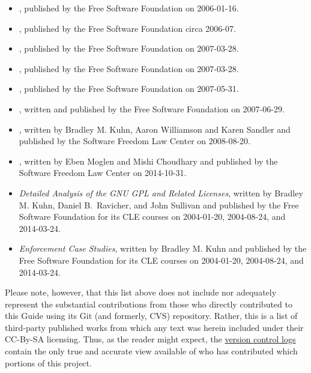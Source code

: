 \label{third-party-citation-list}
\begin{itemize}
\item {}, published by the Free
 Software Foundation on 2006-01-16.
\item {}, published by the Free
 Software Foundation circa 2006-07.
\item {}, published by the Free
 Software Foundation on 2007-03-28.
\item {}, published by the Free Software Foundation on 2007-03-28.
\item {}, published by the Free
 Software Foundation on 2007-05-31.
\item {}, written and published by the Free
 Software Foundation on 2007-06-29.
\item {}, written by Bradley M. Kuhn, Aaron
Williamson and Karen Sandler and published by the Software Freedom Law Center on 2008-08-20.
\item {}, written by Eben Moglen and Mishi Choudhary and published by the Software Freedom Law Center on 2014-10-31.
\item \textit{Detailed Analysis of the GNU GPL and Related Licenses}, written by
Bradley M. Kuhn, Daniel B.~Ravicher, and John Sullivan and published by the Free Software Foundation for its CLE courses on 2004-01-20,
2004-08-24, and 2014-03-24.
\item \textit{Enforcement Case Studies}, written by Bradley M. Kuhn and published by the Free
 Software Foundation for its CLE courses on 2004-01-20, 2004-08-24, and 2014-03-24.
\end{itemize}

Please note, however, that this list above does not include nor adequately
represent the substantial contributions from those who directly
contributed to this Guide using its Git (and formerly, CVS) repository.
Rather, this is a list of third-party published works from which any text was
herein included under their CC-By-SA licensing.  Thus, as the reader might
expect, the
\href{https://k.copyleft.org/guide/changelog}{version
  control logs} contain the only true and accurate view available of who has
contributed which portions of this project.
